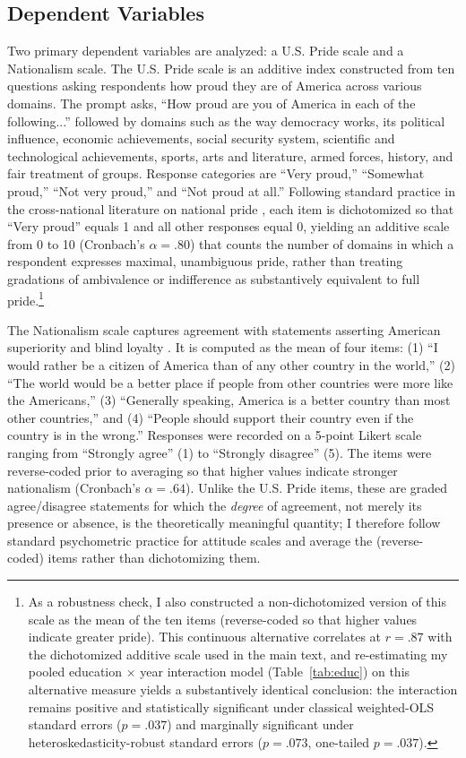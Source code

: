\documentclass[12pt,letterpaper]{article}
\begin{document}
\subsection{Dependent Variables}
Two primary dependent variables are analyzed: a U.S. Pride scale and a Nationalism scale. The U.S. Pride scale is an additive index constructed from ten questions asking respondents how proud they are of America across various domains. The prompt asks, ``How proud are you of America in each of the following...'' followed by domains such as the way democracy works, its political influence, economic achievements, social security system, scientific and technological achievements, sports, arts and literature, armed forces, history, and fair treatment of groups. Response categories are ``Very proud,'' ``Somewhat proud,'' ``Not very proud,'' and ``Not proud at all.'' Following standard practice in the cross-national literature on national pride \citep{smith2006national}, each item is dichotomized so that ``Very proud'' equals 1 and all other responses equal 0, yielding an additive scale from 0 to 10 (Cronbach's $\alpha = .80$) that counts the number of domains in which a respondent expresses maximal, unambiguous pride, rather than treating gradations of ambivalence or indifference as substantively equivalent to full pride.\footnote{As a robustness check, I also constructed a non-dichotomized version of this scale as the mean of the ten items (reverse-coded so that higher values indicate greater pride). This continuous alternative correlates at $r = .87$ with the dichotomized additive scale used in the main text, and re-estimating my pooled education $\times$ year interaction model (Table~\ref{tab:educ}) on this alternative measure yields a substantively identical conclusion: the interaction remains positive and statistically significant under classical weighted-OLS standard errors ($p = .037$) and marginally significant under heteroskedasticity-robust standard errors ($p = .073$, one-tailed $p = .037$).}

The Nationalism scale captures agreement with statements asserting American superiority and blind loyalty \citep{schatz1999varieties}. It is computed as the mean of four items: (1) ``I would rather be a citizen of America than of any other country in the world,'' (2) ``The world would be a better place if people from other countries were more like the Americans,'' (3) ``Generally speaking, America is a better country than most other countries,'' and (4) ``People should support their country even if the country is in the wrong.'' Responses were recorded on a 5-point Likert scale ranging from ``Strongly agree'' (1) to ``Strongly disagree'' (5). The items were reverse-coded prior to averaging so that higher values indicate stronger nationalism (Cronbach's $\alpha = .64$). Unlike the U.S. Pride items, these are graded agree/disagree statements for which the \textit{degree} of agreement, not merely its presence or absence, is the theoretically meaningful quantity; I therefore follow standard psychometric practice for attitude scales and average the (reverse-coded) items rather than dichotomizing them.
\end{document}
